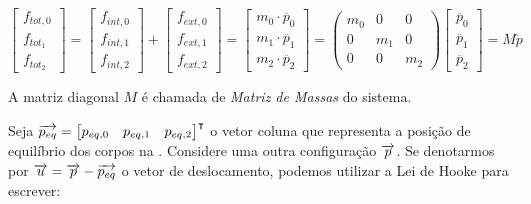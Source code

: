 \begin{equation}
	\begin{bmatrix}
		f_{tot,0}\\
		f_{tot_1}\\
		f_{tot_2}
	\end{bmatrix}
	=
	\begin{bmatrix}
		f_{int,0}\\
		f_{int,1}\\
		f_{int,2}
	\end{bmatrix}
	+\begin{bmatrix}
		f_{ext,0}\\
		f_{ext,1}\\
		f_{ext,2}
	\end{bmatrix}
	= 
	\begin{bmatrix}
		m_0 \cdot \ddot{p_0}\\
		m_1 \cdot \ddot{p_1}\\
		m_2 \cdot \ddot{p_2}
	\end{bmatrix}
	=
	\begin{pmatrix}
		m_0 & 0 & 0\\
		0 & m_1 & 0\\
		0 & 0 & m_2
	\end{pmatrix}
	\begin{bmatrix}
		\ddot{p_0}\\
		\ddot{p_1}\\
		\ddot{p_2}
	\end{bmatrix}
	= M\ddot{p}
\label{vecnewton}
\end{equation}

A matriz diagonal $M$ é chamada de \emph{Matriz de Massas} do sistema.

Seja $\overrightarrow{p_{eq}} = \begin{bmatrix}p_{eq,0} & p_{eq,1} & p_{eq,2}\end{bmatrix}^\intercal$ o vetor coluna que representa a posição de equilíbrio dos corpos na . Considere uma outra configuração $\overrightarrow{p}$. Se denotarmos por $\overrightarrow{u} = \overrightarrow{p}-\overrightarrow{p_{eq}}$ o vetor de deslocamento, podemos utilizar a Lei de Hooke para escrever:

